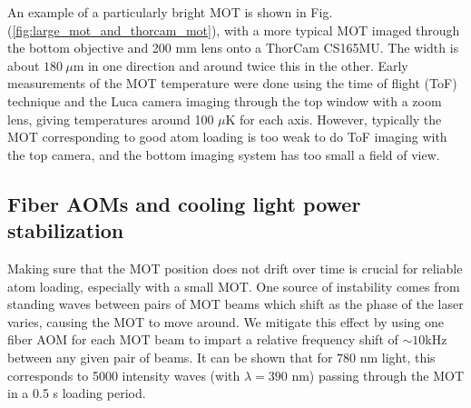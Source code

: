 An example of a particularly bright MOT is shown in Fig. (\ref{fig:large_mot_and_thorcam_mot}), with a more typical MOT imaged through the bottom objective and 200 mm lens onto a ThorCam CS165MU. The width is about $180~\mu$m in one direction and around twice this in the other. Early measurements of the MOT temperature were done using the time of flight (ToF) technique and the Luca camera imaging through the top window with a zoom lens, giving temperatures around 100 $\mu$K for each axis. However, typically the MOT corresponding to good atom loading is too weak to do ToF imaging with the top camera, and the bottom imaging system has too small a field of view.

\subsection{Fiber AOMs and cooling light power stabilization}\label{sec:fiber_AOM_power_stabilization}

Making sure that the MOT position does not drift over time is crucial for reliable atom loading, especially with a small MOT. One source of instability comes from standing waves between pairs of MOT beams which shift as the phase of the laser varies, causing the MOT to move around. We mitigate this effect by using one fiber AOM for each MOT beam to impart a relative frequency shift of $\sim 10$kHz between any given pair of beams. It can be shown that for $780$ nm light, this corresponds to 5000 intensity waves (with $\lambda=390$ nm) passing through the MOT in a 0.5 s loading period. 

